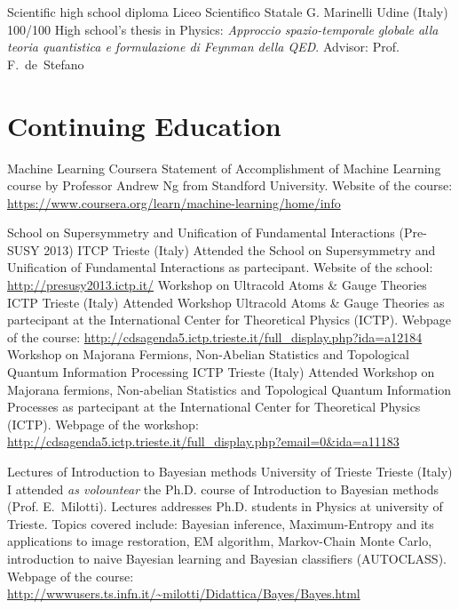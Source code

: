 \documentclass[10pt,a4paper]{moderncv}   %
\begin{document}
{Scientific high school diploma} 
{Liceo Scientifico Statale G. Marinelli}
{Udine (Italy)}
{100/100}
{High school's thesis in Physics: \emph{Approccio spazio-temporale globale alla
      teoria quantistica e formulazione di Feynman della QED}. Advisor: Prof.
   F.~de~Stefano}
 

\section{Continuing Education}


{Machine Learning}
{Coursera}
{}
{}
{Statement of Accomplishment of Machine Learning course by Professor Andrew Ng
   from Standford University.
   Website of the course:
   \url{https://www.coursera.org/learn/machine-learning/home/info}}


{School on Supersymmetry and Unification of Fundamental Interactions (Pre-SUSY
   2013)}
{ITCP}
{Trieste (Italy)}
{}
{Attended the School on Supersymmetry and Unification of
   Fundamental Interactions as partecipant. Website of the school:
   \url{http://presusy2013.ictp.it/}}
{Workshop on Ultracold Atoms \& Gauge
   Theories}
{ICTP}
{Trieste (Italy)}{}
{Attended Workshop Ultracold Atoms \& Gauge Theories as
   partecipant at the International Center for Theoretical Physics (ICTP).
   Webpage of the course:
   \url{http://cdsagenda5.ictp.trieste.it/full_display.php?ida=a12184}}
{Workshop on Majorana Fermions, Non-Abelian Statistics and Topological Quantum Information Processing}%
{ICTP}
{Trieste (Italy)}
{}
{Attended Workshop on Majorana fermions, Non-abelian Statistics and Topological
   Quantum Information Processes as
   partecipant at the International Center for Theoretical Physics (ICTP).
   Webpage of the workshop:
   \url{http://cdsagenda5.ictp.trieste.it/full_display.php?email=0&ida=a11183}}

%
{Lectures of Introduction to Bayesian methods}
{University of Trieste}
{Trieste (Italy)}{}
{I attended \emph{as volountear} the Ph.D. course of Introduction to Bayesian methods (Prof.
   E.~Milotti).
   Lectures addresses Ph.D. students in Physics at university of Trieste.
Topics covered include: Bayesian inference, Maximum-Entropy and its applications
to image restoration, EM algorithm, Markov-Chain Monte Carlo, introduction to
naive Bayesian learning and 
Bayesian classifiers (AUTOCLASS). 
Webpage of the course:
\url{http://wwwusers.ts.infn.it/~milotti/Didattica/Bayes/Bayes.html}
}
\end{document}
